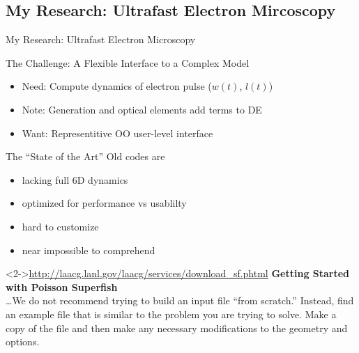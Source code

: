 \documentclass[mathserif]{beamer}
\begin{document}
\subsection{My Research: Ultrafast Electron Mircoscopy}

\begin{frame}{My Research: Ultrafast Electron Microscopy}
  
\end{frame}

\begin{frame}{The Challenge: A Flexible Interface to a Complex Model}
  
  \begin{itemize}
    \item<2-> Need: Compute dynamics of electron pulse ($w(t)$, $l(t)$)
    \item<3-> Note: Generation and optical elements add terms to DE
    \item<4-> Want: Representitive OO user-level interface
  \end{itemize}
\end{frame}

\begin{frame}{The ``State of the Art''}
  Old codes are
  \begin{itemize}
    \item lacking full 6D dynamics
    \item optimized for performance vs usablilty
    \item hard to customize
    \item near impossible to comprehend
  \end{itemize}
  \begin{block}<2->{\url{http://laacg.lanl.gov/laacg/services/download_sf.phtml}}
    \textbf{Getting Started with Poisson Superfish}\\
    \ldots We do not recommend trying to build an input file ``from scratch.'' Instead, find an example file that is similar to the problem you are trying to solve. Make a copy of the file and then make any necessary modifications to the geometry and options.
  \end{block}
\end{frame}
\end{document}
